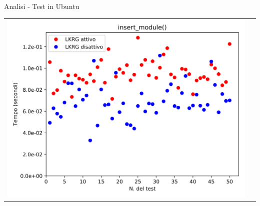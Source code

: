 \documentclass[12pt]{beamer}
\begin{document}
\begin{frame}[fragile]{Analisi - Test in Ubuntu}
\begin{tabular}{ c c }
    	\includegraphics[scale=0.11]{res/Ubuntu/Insert} \\
    \end{tabular}
  \end{frame}
\end{document}
